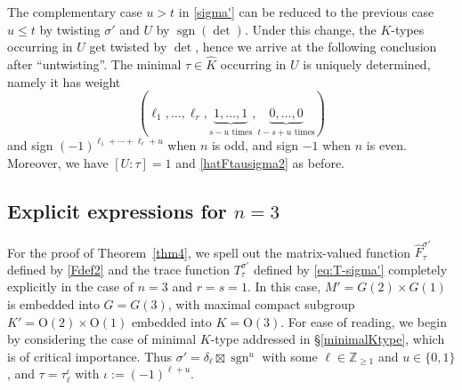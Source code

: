 \documentclass[11pt,oneside]{amsart}
\numberwithin{equation}{section}
\theoremstyle{remark}
\theoremstyle{plain}
\DeclareMathOperator{\sgn}{sgn}
\newcommand\OO{\mathrm{O}}
\newcommand\ZZ{\mathbb{Z}}
\renewcommand\leq{\leqslant}
\renewcommand\geq{\geqslant}
\begin{document}
The complementary case $u>t$ in \eqref{sigma'} can be reduced to the previous case $u\leq t$ by twisting $\sigma'$ and $U$ by $\sgn(\det)$. Under this change, the $K$-types occurring in $U$ get twisted by $\det$, hence we arrive at the following conclusion after ``untwisting''. The minimal $\tau\in\widehat{K}$ occurring in $U$ is uniquely determined, namely it has weight 
\[
(\ell_1,\dotsc,\ell_r,\underbrace{1,\dotsc,1}_{\text{$s-u$ times}},\underbrace{0,\dotsc,0}_{\text{$t-s+u$ times}})
\]
and sign $(-1)^{\ell_1+\dotsb+\ell_r+u}$ when $n$ is odd, and sign $-1$ when $n$ is even. Moreover, we have $[U:\tau]=1$ and \eqref{hatFtausigma2} as before.

\subsection{Explicit expressions for $n=3$}\label{oldsubsection}
For the proof of Theorem~\ref{thm4}, we spell out the matrix-valued function $\hat F_\tau^{\sigma'}$ defined by \eqref{Fdef2} and the trace function $T_{\tau}^{\sigma'}$ defined by \eqref{eq:T-sigma'} completely explicitly in the case of $n=3$ and $r=s=1$. In this case, $M'=G(2)\times G(1)$ is embedded into $G=G(3)$, with maximal compact subgroup $K'=\OO(2)\times\OO(1)$ embedded into $K=\OO(3)$. For ease of reading, we begin by considering the case of minimal $K$-type addressed in \S\ref{minimalKtype}, which is of critical importance.
Thus $\sigma'=\delta_{\ell}\boxtimes\sgn^{u}$ with some $\ell\in\ZZ_{\geq 1}$ and $u\in\{0,1\}$, and  $\tau=\tau_{\ell}^{\iota}$ with $\iota:=(-1)^{\ell+u}$.
\end{document}
